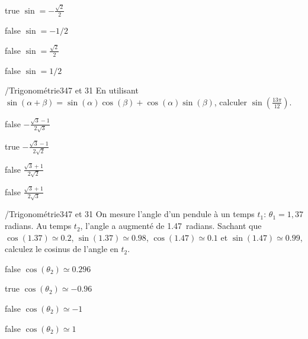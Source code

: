\documentclass[11pt]{article}
\begin{document}
            \begin{reponses}
                \item[true] $\sin = -\frac{\sqrt{2}}{2}$
                \item[false] $\sin = -1/2$
                \item[false] $\sin = \frac{\sqrt{2}}{2}$
                \item[false] $\sin = 1/2$
            \end{reponses}
    
            \begin{question}{/}{Trigonométrie}{3}{47 et 31}
                En utilisant $\sin(\alpha+\beta)=\sin(\alpha)\cos(\beta) + \cos(\alpha)\sin(\beta)$, calculer $\sin(\frac{13\pi}{12})$.
            \end{question}

            \begin{reponses}
                \item[false] $-\frac{\sqrt{3}-1}{2\sqrt{3}}$
                \item[true] $-\frac{\sqrt{3}-1}{2\sqrt{2}}$
                \item[false] $\frac{\sqrt{3}+1}{2\sqrt{2}}$
                \item[false] $\frac{\sqrt{3}+1}{2\sqrt{3}}$
            \end{reponses}

            \begin{question}{/}{Trigonométrie}{3}{47 et 31}
                On mesure l'angle d'un pendule à un temps $t_1$: $\theta_1=1,37$ radians. Au temps $t_2$, l'angle a augmenté de \num{1.47}~radians. Sachant que $\cos(\num{1.37})\simeq \num{0.2}$, $\sin(\num{1.37})\simeq \num{0.98}$, $\cos(\num{1.47})\simeq \num{0.1}$ et $\sin(\num{1.47})\simeq \num{0.99}$, calculez le cosinus de l'angle en $t_2$.
            \end{question}

            \begin{reponses}
                \item[false] $\cos(\theta_2) \simeq \num{0.296}$
                \item[true] $\cos(\theta_2) \simeq \num{-0.96}$
                \item[false] $\cos(\theta_2) \simeq \num{-1}$
                \item[false] $\cos(\theta_2) \simeq \num{1}$
            \end{reponses}
    
\end{document}
